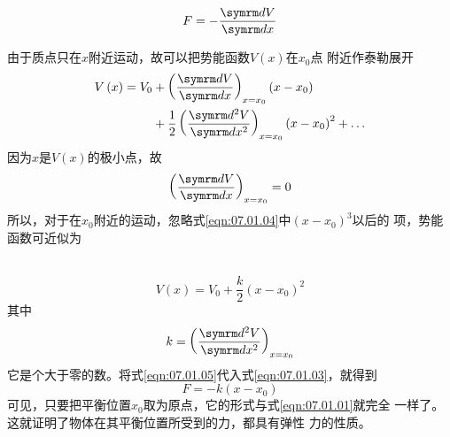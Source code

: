 \begin{equation}\label{eqn:07.01.03}
  F = - \frac { \dif V } { \dif x }
\end{equation}

由于质点只在$ x $附近运动，故可以把势能函数$ V\left(x\right) $在$  x _ { 0 }   $点
附近作泰勒展开
\begin{equation}\label{eqn:07.01.04}
  \begin{aligned}
    V \left( x \right) = V _ { 0 } & + \left ( \frac { \dif V } { \dif x } \right ) _ { x = x _ { 0 } } \left( x - x _ { 0 } \right)                                                 \\
                                   & + \frac { 1 } { 2 } \left( \frac { \dif ^ { 2 } V } { \dif x ^ { 2 } } \right) _ { x = x _ { 0 } } \left( x - x _ { 0 } \right) ^ { 2 } + \dots
  \end{aligned}
\end{equation}
因为$ x $是$ V\left(x\right) $的极小点，故
\begin{equation*}
  \left( \frac { \dif V } { \dif x } \right) _ { x = x _ { 0 } }  = 0
\end{equation*}
所以，对于在$ x _ { 0 } $附近的运动，忽略式\eqref{eqn:07.01.04}中$ \left( x - x _ { 0 } \right) ^ { 3 }  $以后的
项，势能函数可近似为

\clearpage
~\vspace{-2.5em}
\begin{equation}\label{eqn:07.01.05}
  V \left( x \right) = V _ { 0 } + \frac { k } { 2 } \left( x - x _ { 0 } \right) ^ { 2 }
\end{equation}
其中\vspace{-1.8em}
\begin{equation}\label{eqn:07.01.06}
  k = \left( \frac { \dif ^ { 2 } V } { \dif x ^ { 2 } } \right) _ { x = x _ { 0 } }
\end{equation}
它是个大于零的数。将式\eqref{eqn:07.01.05}代入式\eqref{eqn:07.01.03}，就得到
\begin{equation}\label{eqn:07.01.07}
  F = - k \left( x - x _ { 0 } \right)
\end{equation}
可见，只要把平衡位置$ x _ 0 $取为原点，它的形式与式\eqref{eqn:07.01.01}就完全
一样了。这就证明了物体在其平衡位置所受到的力，都具有弹性
力的性质。

